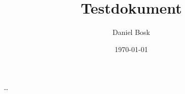 \documentclass[a4paper]{article}
\author{Daniel Bosk}
\title{Testdokument}
\date{\today}
\begin{document}
\maketitle
\tableofcontents

\dots
\end{document}
